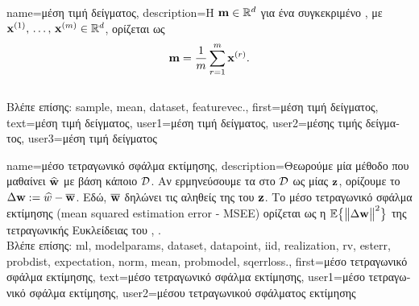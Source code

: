 {name={\foreignlanguage{greek}{μέση τιμή δείγματος}}, 
	description={\foreignlanguage{greek}{Η} 
		  ${\bf m} \in \mathbb{R}^{d}$ \foreignlanguage{greek}{για ένα συγκεκριμένο} 
		, \foreignlanguage{greek}{με} 
		 ${\bf x}^{(1)}, \,\ldots, \,{\bf x}^{(m)} \in \mathbb{R}^{d}$, 
		\foreignlanguage{greek}{ορίζεται ως}  
		$${\bf m} = \frac{1}{m} \sum_{r=1}^{m} {\bf x}^{(r)}.$$\\
		\foreignlanguage{greek}{Βλέπε επίσης:} \gls{sample}, \gls{mean}, \gls{dataset}, \gls{featurevec}.},
	first={\foreignlanguage{greek}{μέση τιμή δείγματος}},
	text={\foreignlanguage{greek}{μέση τιμή δείγματος}},
	user1={\foreignlanguage{greek}{μέση τιμή δείγματος}}, %
	user2={\foreignlanguage{greek}{μέσης τιμής δείγματος}}, %
	user3={\foreignlanguage{greek}{μέση τιμή δείγματος}} %
}

{name={\foreignlanguage{greek}{μέσο τετραγωνικό σφάλμα εκτίμησης}},
	description={\foreignlanguage{greek}{Θεωρούμε μία μέθοδο} 
		 \foreignlanguage{greek}{που μαθαίνει}  $\widehat{{\bf w}}$ 
		\foreignlanguage{greek}{με βάση κάποιο}  $\mathcal{D}$. 
		\foreignlanguage{greek}{Αν ερμηνεύσουμε τα}  \foreignlanguage{greek}{στο} $\mathcal{D}$ 
		\foreignlanguage{greek}{ως}   \foreignlanguage{greek}{μίας}  ${\bf z}$, 
		\foreignlanguage{greek}{ορίζουμε το}  $\Delta {\bf w} := \widehat{w} - \overline{{\bf w}}$. 
		\foreignlanguage{greek}{Εδώ, $\overline{{\bf w}}$ δηλώνει τις αληθείς}  \foreignlanguage{greek}{της} 
		 \foreignlanguage{greek}{του ${\bf z}$. Το μέσο τετραγωνικό σφάλμα εκτίμησης} 
		(mean squared estimation error - MSEE) \foreignlanguage{greek}{ορίζεται ως η}  
		$\mathbb{E} \big\{ \big\| \Delta {\bf w} \big\|^{2} \big\}$ \foreignlanguage{greek}{της τετραγωνικής Ευκλεί\-δειας}
		 \foreignlanguage{greek}{του}  \cite{LC}, \cite{kay}.\\
		\foreignlanguage{greek}{Βλέπε επίσης:} \gls{ml}, \glspl{modelparam}, \gls{dataset}, \gls{datapoint}, \gls{iid}, \gls{realization}, \gls{rv}, 
		\gls{esterr}, \gls{probdist}, \gls{expectation}, \gls{norm},  \gls{mean}, \gls{probmodel}, \gls{sqerrloss}.},
	first={\foreignlanguage{greek}{μέσο τετραγωνικό σφάλμα εκτίμησης}},
	text={\foreignlanguage{greek}{μέσο τετραγωνικό σφάλμα εκτίμησης}},
	user1={\foreignlanguage{greek}{μέσο τετραγωνικό σφάλμα εκτίμησης}}, %
    	user2={\foreignlanguage{greek}{μέσου τετραγωνικού σφάλματος εκτίμησης}} %
}

